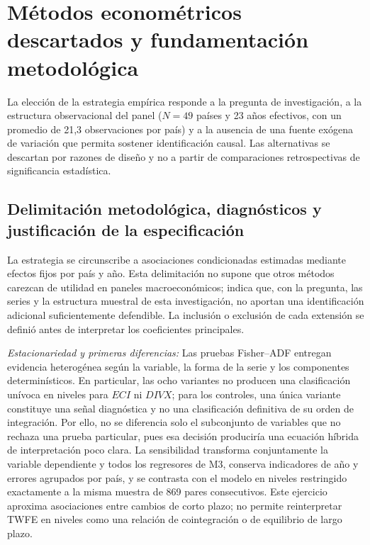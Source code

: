 \documentclass[../../TFM.tex]{subfiles}
\begin{document}
	\section{Métodos econométricos descartados y fundamentación metodológica}
	\label{sec:metodos-descartados}

	La elección de la estrategia empírica responde a la pregunta de investigación,
	a la estructura observacional del panel ($N=49$ países y 23 años efectivos,
	con un promedio de 21,3 observaciones por país) y a la ausencia de una fuente
	exógena de variación que permita sostener identificación causal. Las
	alternativas se descartan por razones de diseño y no a partir de comparaciones
	retrospectivas de significancia estadística.

	\subsection{Delimitación metodológica, diagnósticos y justificación de la especificación}
	\label{subsec:delimitacion-metodologica}

	La estrategia se circunscribe a asociaciones condicionadas estimadas mediante
	efectos fijos por país y año. Esta delimitación no supone que otros métodos
	carezcan de utilidad en paneles macroeconómicos; indica que, con la pregunta,
	las series y la estructura muestral de esta investigación, no aportan una
	identificación adicional suficientemente defendible. La inclusión o exclusión
	de cada extensión se definió antes de interpretar los coeficientes principales.

	\noindent\textit{Estacionariedad y primeras diferencias:} Las pruebas
	Fisher--ADF entregan evidencia heterogénea según la variable, la forma de la
	serie y los componentes determinísticos. En particular, las ocho variantes no
	producen una clasificación unívoca en niveles para $ECI$ ni $DIVX$; para los
	controles, una única variante constituye una señal diagnóstica y no una
	clasificación definitiva de su orden de integración. Por ello, no se diferencia
	solo el subconjunto de variables que no rechaza una prueba particular, pues esa
	decisión produciría una ecuación híbrida de interpretación poco clara. La
	sensibilidad transforma conjuntamente la variable dependiente y todos los
	regresores de M3, conserva indicadores de año y errores agrupados por país, y
	se contrasta con el modelo en niveles restringido exactamente a la misma
	muestra de 869 pares consecutivos. Este ejercicio aproxima asociaciones entre
	cambios de corto plazo; no permite reinterpretar TWFE en niveles como una
	relación de cointegración o de equilibrio de largo plazo.
\end{document}
